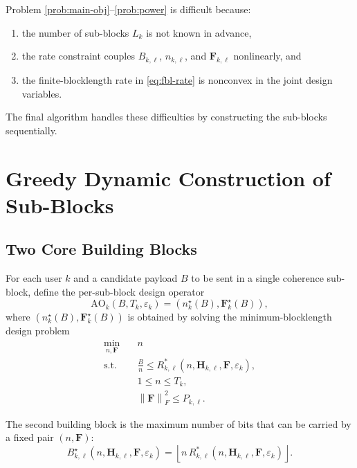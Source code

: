 \documentclass[11pt]{article}
\newcommand{\F}{\mathbf{F}}
\newcommand{\Hc}{\mathbf{H}}
\newcommand{\norm}[1]{\left\lVert #1 \right\rVert}
\newcommand{\floor}[1]{\left\lfloor #1 \right\rfloor}
\begin{document}
Problem \eqref{prob:main-obj}--\eqref{prob:power} is difficult because:
\begin{enumerate}
    \item the number of sub-blocks $L_k$ is not known in advance,
    \item the rate constraint couples $B_{k,\ell}$, $n_{k,\ell}$, and $\F_{k,\ell}$ nonlinearly, and
    \item the finite-blocklength rate in \eqref{eq:fbl-rate} is nonconvex in the joint design variables.
\end{enumerate}
The final algorithm handles these difficulties by constructing the sub-blocks sequentially.

\section{Greedy Dynamic Construction of Sub-Blocks}
\subsection{Two Core Building Blocks}
For each user $k$ and a candidate payload $B$ to be sent in a single coherence sub-block, define the per-sub-block design operator
\begin{equation}
\mathrm{AO}_k(B,T_k,\varepsilon_k)
=
(n_k^\star(B),\F_k^\star(B)),
\label{eq:ao-operator}
\end{equation}
where $(n_k^\star(B),\F_k^\star(B))$ is obtained by solving the minimum-blocklength design problem
\begin{subequations}
\begin{align}
\min_{n,\F}\quad & n
\label{prob:single-block-obj}
\\
\text{s.t.}\quad
&
\frac{B}{n}
\le
R_{k,\ell}^*(n,\Hc_{k,\ell},\F,\varepsilon_k),
\label{prob:single-block-rate}
\\
&
1 \le n \le T_k,
\label{prob:single-block-n}
\\
&
\norm{\F}_F^2 \le P_{k,\ell}.
\label{prob:single-block-p}
\end{align}
\end{subequations}

The second building block is the maximum number of bits that can be carried by a fixed pair $(n,\F)$:
\begin{equation}
B_{k,\ell}^\star(n,\Hc_{k,\ell},\F,\varepsilon_k)
=
\floor{
n\,
R_{k,\ell}^*(n,\Hc_{k,\ell},\F,\varepsilon_k)
}.
\label{eq:b-star}
\end{equation}
\end{document}
